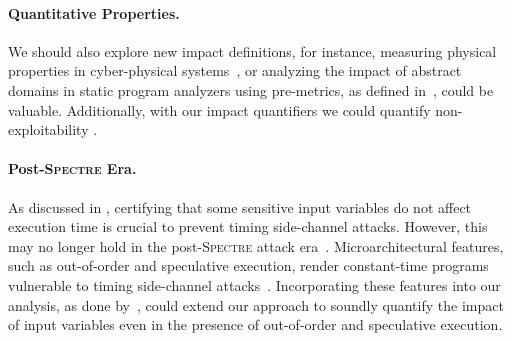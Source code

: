 \paragraph{Quantitative Properties.}

We should also explore new impact definitions, for instance, measuring physical properties in cyber-physical systems~, or analyzing the impact of abstract domains in static program analyzers using pre-metrics, as defined in~, could be valuable.
Additionally, with our impact quantifiers we could quantify non-exploitability .

\paragraph{Post-\textsc{Spectre} Era.}

As discussed in , certifying that some sensitive input variables do not affect execution time is crucial to prevent timing side-channel attacks. However, this may no longer hold in the post-\textsc{Spectre} attack era~. Microarchitectural features, such as out-of-order and speculative execution, render constant-time programs vulnerable to timing side-channel attacks~. Incorporating these features into our analysis, as done by~, could extend our approach to soundly quantify the impact of input variables even in the presence of out-of-order and speculative execution.
